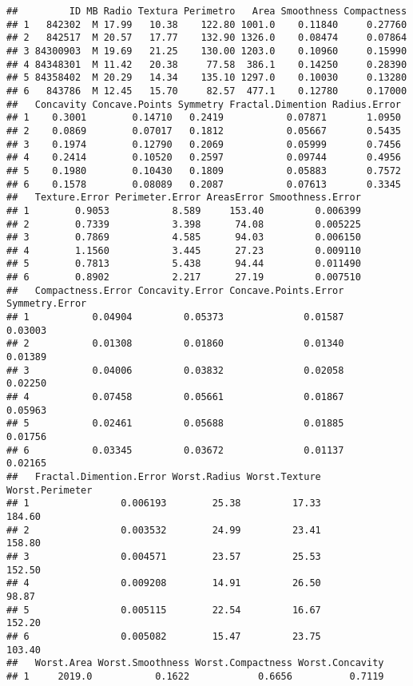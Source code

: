 \documentclass[]{article}
\begin{document}
\begin{verbatim}
##         ID MB Radio Textura Perimetro   Area Smoothness Compactness
## 1   842302  M 17.99   10.38    122.80 1001.0    0.11840     0.27760
## 2   842517  M 20.57   17.77    132.90 1326.0    0.08474     0.07864
## 3 84300903  M 19.69   21.25    130.00 1203.0    0.10960     0.15990
## 4 84348301  M 11.42   20.38     77.58  386.1    0.14250     0.28390
## 5 84358402  M 20.29   14.34    135.10 1297.0    0.10030     0.13280
## 6   843786  M 12.45   15.70     82.57  477.1    0.12780     0.17000
##   Concavity Concave.Points Symmetry Fractal.Dimention Radius.Error
## 1    0.3001        0.14710   0.2419           0.07871       1.0950
## 2    0.0869        0.07017   0.1812           0.05667       0.5435
## 3    0.1974        0.12790   0.2069           0.05999       0.7456
## 4    0.2414        0.10520   0.2597           0.09744       0.4956
## 5    0.1980        0.10430   0.1809           0.05883       0.7572
## 6    0.1578        0.08089   0.2087           0.07613       0.3345
##   Texture.Error Perimeter.Error AreasError Smoothness.Error
## 1        0.9053           8.589     153.40         0.006399
## 2        0.7339           3.398      74.08         0.005225
## 3        0.7869           4.585      94.03         0.006150
## 4        1.1560           3.445      27.23         0.009110
## 5        0.7813           5.438      94.44         0.011490
## 6        0.8902           2.217      27.19         0.007510
##   Compactness.Error Concavity.Error Concave.Points.Error Symmetry.Error
## 1           0.04904         0.05373              0.01587        0.03003
## 2           0.01308         0.01860              0.01340        0.01389
## 3           0.04006         0.03832              0.02058        0.02250
## 4           0.07458         0.05661              0.01867        0.05963
## 5           0.02461         0.05688              0.01885        0.01756
## 6           0.03345         0.03672              0.01137        0.02165
##   Fractal.Dimention.Error Worst.Radius Worst.Texture Worst.Perimeter
## 1                0.006193        25.38         17.33          184.60
## 2                0.003532        24.99         23.41          158.80
## 3                0.004571        23.57         25.53          152.50
## 4                0.009208        14.91         26.50           98.87
## 5                0.005115        22.54         16.67          152.20
## 6                0.005082        15.47         23.75          103.40
##   Worst.Area Worst.Smoothness Worst.Compactness Worst.Concavity
## 1     2019.0           0.1622            0.6656          0.7119

\end{verbatim}
\end{document}
